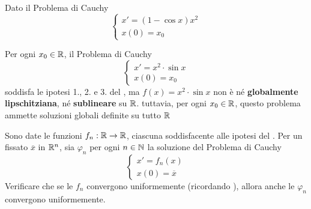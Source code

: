 \begin{example}
	Dato il Problema di Cauchy
	\[\begin{cases}
		x' = (1-\cos x) x^2\\
		x(0) = x_0
	\end{cases}\]
\end{example}
\begin{example}
	Per ogni $x_0 \in \mathbb{R}$, il Problema di Cauchy
	\begin{equation*}
		\begin{cases}
			x' = x^2 \cdot \sin x\\
			x(0) = x_0
		\end{cases}
	\end{equation*}
	soddisfa le ipotesi 1., 2. e 3. del , ma $f(x) = x^2 \cdot \sin x$ non è né \textbf{globalmente lipschitziana}, né \textbf{sublineare} su $\mathbb{R}$. tuttavia, per ogni $x_0 \in \mathbb{R}$, questo problema ammette soluzioni globali definite su tutto $\mathbb{R}$
\end{example}
\begin{exercise}
	Sono date le funzioni $f_n:\mathbb{R} \to \mathbb{R}$, ciascuna soddisfacente alle ipotesi del . Per un fissato $\overline{x}$ in $\mathbb{R}^n$, sia $\varphi_n$ per ogni $n \in \mathbb{N}$ la soluzione del Problema di Cauchy
	\begin{equation*}
		\begin{cases}
			x' = f_n(x)\\
			x(0) = \overline{x}
		\end{cases}
	\end{equation*}
	Verificare che se le $f_n$ convergono uniformemente (ricordando ), allora anche le $\varphi_n$ convergono uniformemente.
\end{exercise}


\newpage
